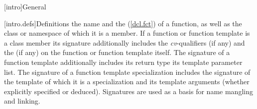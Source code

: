 \documentclass[american]{book}
\begin{document}

\renewcommand{\sectionmark}[1]{\markright{\thesection\hspace{1em}#1}}
\renewcommand{\chaptermark}[1]{\markboth{#1}{}}

[intro]{General}

\begin{paras}
\setcounter{section}{2}
[intro.defs]{Definitions}
\setcounter{Paras}{10}
%
the name and the 
(\mbox{\ref{dcl.fct}}) of a function, as well as the class or namespace 
of which it is a member. If a function or function template is a class
member its signature additionally includes the
\mbox{\textit{cv}}-qualifiers (if any) and the
 (if any) on the function or function
template itself. 
 The signature of a function template additionally
includes its return type\mbox{} its template parameter 
list\mbox{}.
The signature
of a function template specialization includes the signature of the
template of which it is a specialization and its template arguments
(whether explicitly specified or deduced). \mbox{\enternote}Signatures
are used as a basis for name mangling and linking.\mbox{\exitnote}
\end{paras}
\end{document}
